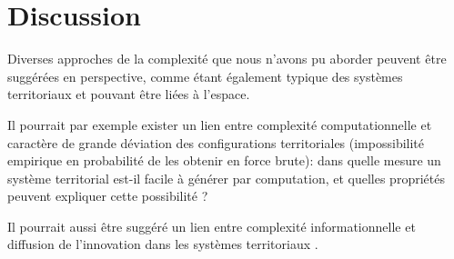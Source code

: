 \documentclass[11pt]{article}
\begin{document}



%


\section{Discussion}



Diverses approches de la complexité que nous n'avons pu aborder peuvent être suggérées en perspective, comme étant également typique des systèmes territoriaux et pouvant être liées à l'espace.

Il pourrait par exemple exister un lien entre complexité computationnelle et caractère de grande déviation des configurations territoriales (impossibilité empirique en probabilité de les obtenir en force brute): dans quelle mesure un système territorial est-il facile à générer par computation, et quelles propriétés peuvent expliquer cette possibilité ?

Il pourrait aussi être suggéré un lien entre complexité informationnelle et diffusion de l'innovation dans les systèmes territoriaux \citep{favaro2011gibrat}.
\end{document}
